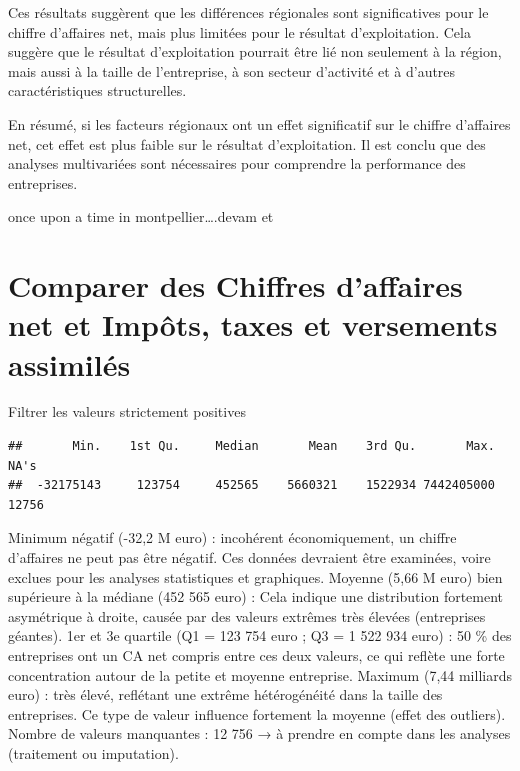 \documentclass[mstat,12pt]{unswthesis}
\begin{document}
Ces résultats suggèrent que les différences régionales sont
significatives pour le chiffre d'affaires net, mais plus limitées pour
le résultat d'exploitation. Cela suggère que le résultat d'exploitation
pourrait être lié non seulement à la région, mais aussi à la taille de
l'entreprise, à son secteur d'activité et à d'autres caractéristiques
structurelles.

En résumé, si les facteurs régionaux ont un effet significatif sur le
chiffre d'affaires net, cet effet est plus faible sur le résultat
d'exploitation. Il est conclu que des analyses multivariées sont
nécessaires pour comprendre la performance des entreprises.

once upon a time in montpellier\ldots.devam et

\newpage

\section{\texorpdfstring{\textbf{Comparer des Chiffres d'affaires net et
Impôts, taxes et versements
assimilés}}{Comparer des Chiffres d'affaires net et Impôts, taxes et versements assimilés}}\label{comparer-des-chiffres-daffaires-net-et-impuxf4ts-taxes-et-versements-assimiluxe9s}

\medskip

Filtrer les valeurs strictement positives

\medskip

\scriptsize

\begin{verbatim}
##       Min.    1st Qu.     Median       Mean    3rd Qu.       Max.       NA's 
##  -32175143     123754     452565    5660321    1522934 7442405000      12756
\end{verbatim}

\normalsize

\medskip

Minimum négatif (-32,2 M euro) : incohérent économiquement, un chiffre
d'affaires ne peut pas être négatif. Ces données devraient être
examinées, voire exclues pour les analyses statistiques et graphiques.
Moyenne (5,66 M euro) bien supérieure à la médiane (452 565 euro) : Cela
indique une distribution fortement asymétrique à droite, causée par des
valeurs extrêmes très élevées (entreprises géantes). 1er et 3e quartile
(Q1 = 123 754 euro ; Q3 = 1 522 934 euro) : 50 \% des entreprises ont un
CA net compris entre ces deux valeurs, ce qui reflète une forte
concentration autour de la petite et moyenne entreprise. Maximum (7,44
milliards euro) : très élevé, reflétant une extrême hétérogénéité dans
la taille des entreprises. Ce type de valeur influence fortement la
moyenne (effet des outliers). Nombre de valeurs manquantes : 12 756 → à
prendre en compte dans les analyses (traitement ou imputation).
\end{document}

